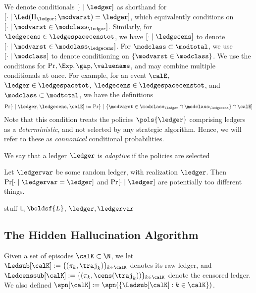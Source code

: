 
We denote conditionals $[\cdot \mid \ledger]$ as shorthand for $[\cdot \mid\Led(\Pi_{\ledger};\modvarst) =  \ledger]$, which equivalently conditions on $[\cdot \mid \modvarst \in \modclass_{\ledger}]$. Similarly, for $\ledgecens \in \ledgespacecenstot$, we have $[\cdot \mid \ledgecens]$ to denote $[\cdot \mid \modvarst \in \modclass_{\ledgecens}]$.  
%
For $ \modclass \subset \modtotal$, we use $[\cdot \mid \modclass]$  to denote conditioning on $\{\modvarst \in \modclass\}$. We use the conditions for $\Pr,\Exp,\gap,\valuename$, and may combine multiple conditionals at once. For example, for an event $\calE$, $\ledger \in \ledgespacetot$, $\ledgecens \in \ledgespacecenstot$, and $\modclass \subset \modtotal$, we have the definitions
\begin{align*}
\Pr[ \cdot \mid  \ledger, \ledgecens,\calE] &:= \Pr[ \cdot \mid \{\modvarst \in \modclass_{\ledger}\cap\modclass_{\ledgecens}\} \cap \calE]\\
\end{align*}
Note that this condition treats the policies $\pols{\ledger}$ comprising ledgers as a \emph{deterministic}, and not selected by any strategic algorithm. Hence, we will refer to these as \emph{cannonical} conditional probabilities. 

 We say that a ledger $\ledger$ is \emph{adaptive} if the policies are selected \mscomment{\dots}


Let $\ledgervar$ be some random ledger, with realization $\ledger$. Then $\Pr[\cdot \mid \ledgervar = \ledger]$ and $\Pr[\cdot \mid \ledger]$ are potentially too different things.
  






stuff
$\mathsf{L},\boldsf{L}$, $\ledger,\ledgervar$
\subsection{The Hidden Hallucination Algorithm}
  Given a set of episodes $\calK \subset \N$, we let $\Ledsub[\calK] := \{(\pi_k,\traj_k)\}_{k \in \calK}$ denotes its raw ledger, and $\Ledcenssub[\calK] := \{(\pi_k,\cens(\traj_k))\}_{k \in \calK}$ denote the censored ledger. We also defined $\spn[\calK] := \spn(\{\Ledsub[\calK]: k \in \calK\})$.


